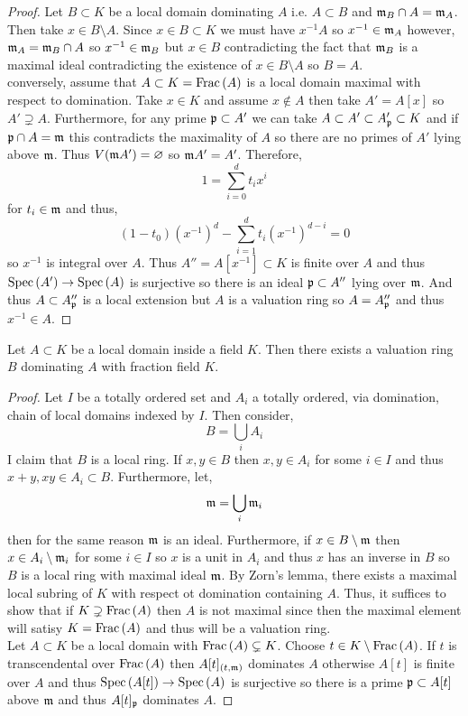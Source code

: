 \documentclass[12pt]{article}
\begin{document}
\begin{proof}
Let $B \subset K$ be a local domain dominating $A$ i.e. $A \subset B$ and $\mathfrak{m}_B \cap A = \mathfrak{m}_A$. Then take $x \in B \setminus A$. Since $x \in B \subset K$ we must have $x^{-1} A$ so $x^{-1} \in \mathfrak{m}_A$ however, $\mathfrak{m}_A = \mathfrak{m}_B \cap A$ so $x^{-1} \in \mathfrak{m}_B$ but $x \in B$ contradicting the fact that $\mathfrak{m}_B$ is a maximal ideal contradicting the existence of $x \in B \setminus A$ so $B = A$. 
\bigskip\\
conversely, assume that $A \subset K = \mathrm{Frac}\left(A\right)$ is a local domain maximal with respect to domination. Take $x \in K$ and assume $x \notin A$ then take $A' = A[x]$ so $A' \supsetneq A$. Furthermore, for any prime $\mathfrak{p} \subset A'$ we can take $A \subset A' \subset A'_{\mathfrak{p}} \subset K$ and if $\mathfrak{p} \cap A = \mathfrak{m}$ this contradicts the maximality of $A$ so there are no primes of $A'$ lying above $\mathfrak{m}$. Thus $V(\mathfrak{m} A') = \varnothing$ so $\mathfrak{m} A' = A'$. Therefore,
\[ 1 = \sum_{i = 0}^d t_i x^i \]
for $t_i \in \mathfrak{m}$ and thus,
\[ (1 - t_0) (x^{-1})^d - \sum_{i = 1}^d t_i (x^{-1})^{d - i} = 0 \]
so $x^{-1}$ is integral over $A$. Thus $A'' = A[x^{-1}] \subset K$ is finite over $A$ and thus $\mathrm{Spec}\left( A' \right) \to \mathrm{Spec}\left( A \right)$ is surjective so there is an ideal $\mathfrak{p} \subset A''$ lying over $\mathfrak{m}$. And thus $A \subset A''_{\mathfrak{p}}$ is a local extension but $A$ is a valuation ring so $A = A''_{\mathfrak{p}}$ and thus $x^{-1} \in A$.
\end{proof}

\begin{prop}
Let $A \subset K$ be a local domain inside a field $K$. Then there exists a valuation ring $B$ dominating $A$ with fraction field $K$.
\end{prop}

\begin{proof}
Let $I$ be a totally ordered set and $A_i$ a totally ordered, via domination, chain of local domains indexed by $I$. Then consider,
\[ B = \bigcup_i A_i \]
I claim that $B$ is a local ring. If $x, y \in B$ then $x, y \in A_i$ for some $i \in I$ and thus $x + y, xy \in A_i \subset B$. Furthermore, let,
\[ \mathfrak{m} = \bigcup_i \mathfrak{m}_i \]
then for the same reason $\mathfrak{m}$ is an ideal. Furthermore, if $x \in B \setminus \mathfrak{m}$ then $x \in A_i \setminus \mathfrak{m}_i$ for some $i \in I$ so $x$ is a unit in $A_i$ and thus $x$ has an inverse in $B$ so $B$ is a local ring with maximal ideal $\mathfrak{m}$. 
By Zorn's lemma, there exists a maximal local subring of $K$ with respect ot domination containing $A$. Thus, it suffices to show that if $K \supsetneq \mathrm{Frac}\left(A\right)$ then $A$ is not maximal since then the maximal element will satisy $K = \mathrm{Frac}\left(A\right)$ and thus will be a valuation ring.
\bigskip\\
Let $A \subset K$ be a local domain with $\mathrm{Frac}\left(A\right) \subsetneq K$. Choose $t \in K \setminus \mathrm{Frac}\left(A\right)$. If $t$ is transcendental over $\mathrm{Frac}\left(A\right)$ then $A[t]_{(t, \mathfrak{m})}$ dominates $A$ otherwise $A[t]$ is finite over $A$ and thus $\mathrm{Spec}\left( A[t] \right) \to \mathrm{Spec}\left( A \right)$ is surjective so there is a prime $\mathfrak{p} \subset A[t]$ above $\mathfrak{m}$ and thus $A[t]_{\mathfrak{p}}$ dominates $A$.
\end{proof}
\end{document}
